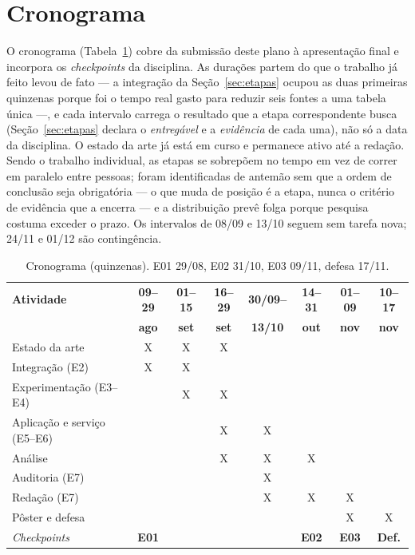 \documentclass[conference]{IEEEtran}
\begin{document}
\section{Cronograma}
\label{sec:crono}

O cronograma (Tabela~\ref{tab:crono}) cobre da submissão deste plano à
apresentação final e incorpora os \emph{checkpoints} da disciplina. As
durações partem do que o trabalho já feito levou de fato --- a integração da
Seção~\ref{sec:etapas} ocupou as duas primeiras quinzenas porque foi o tempo
real gasto para reduzir seis fontes a uma tabela única ---, e cada intervalo
carrega o resultado que a etapa correspondente busca (Seção~\ref{sec:etapas}
declara o \emph{entregável} e a \emph{evidência} de cada uma), não só a data
da disciplina. O estado da
arte já está em curso e permanece ativo até a redação. Sendo o trabalho
individual, as etapas se sobrepõem no tempo em vez de correr em paralelo entre
pessoas; foram identificadas de antemão sem que a ordem de conclusão seja
obrigatória --- o que muda de posição é a etapa, nunca o critério de evidência
que a encerra --- e a distribuição prevê folga porque pesquisa costuma exceder o
prazo. Os intervalos de 08/09 e 13/10 seguem sem tarefa nova; 24/11 e 01/12 são
contingência.

\begin{table}[!h]
\caption{Cronograma (quinzenas). E01 29/08, E02 31/10, E03 09/11, defesa 17/11.}
\label{tab:crono}
\centering
\renewcommand{\arraystretch}{0.88}
\setlength{\tabcolsep}{2.4pt}
\tiny
\begin{tabular}{@{}>{\raggedright\arraybackslash}p{1.85cm}ccccccc@{}}
\toprule
\textbf{Atividade} & \textbf{09--29} & \textbf{01--15} & \textbf{16--29} &
\textbf{30/09--} & \textbf{14--31} & \textbf{01--09} & \textbf{10--17} \\
 & \textbf{ago} & \textbf{set} & \textbf{set} & \textbf{13/10} &
\textbf{out} & \textbf{nov} & \textbf{nov} \\
\midrule
Estado da arte             & X & X & X &   &   &   &   \\
Integração (E2)            & X & X &   &   &   &   &   \\
Experimentação (E3--E4)    &   & X & X &   &   &   &   \\
Aplicação e serviço (E5--E6) &   &   & X & X &   &   &   \\
Análise                    &   &   & X & X & X &   &   \\
Auditoria (E7)             &   &   &   & X &   &   &   \\
Redação (E7)               &   &   &   & X & X & X &   \\
Pôster e defesa            &   &   &   &   &   & X & X \\
\midrule
\textit{Checkpoints} & \textbf{E01} & & & & \textbf{E02} & \textbf{E03} & \textbf{Def.} \\
\bottomrule
\end{tabular}
\end{table}
\end{document}
